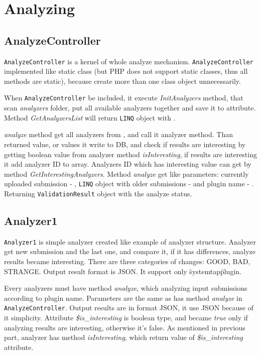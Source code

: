 \section{Analyzing}

\subsection{AnalyzeController}

\texttt{AnalyzeController} is a kernel of whole analyze mechanism. \texttt{AnalyzeController} implemented like static class (but PHP does not support static classes, thus all methods are static), because create more than one class object unnecessarily.

When \texttt{AnalyzeController} be included, it execute \emph{InitAnalyzers} method, that scan \emph{analyzers} folder, put all available analyzers together and save it to \emph{} attribute. Method \emph{GetAnalyzersList} will return \texttt{LINQ} object with \emph{}.

\emph{analyze} method get all analyzers from \emph{}, and call it analyzer method. Than returned value, or values it write to DB, and check if results are interesting by getting boolean value from analyzer method \emph{isInteresting}, if results are interesting it add analyzer ID to \emph{} array. Analyzers ID which has interesting value can get by method \emph{GetInterestingAnalyzers}. Method \emph{analyze} get like parameters: currently uploaded submission - \emph{}, \texttt{LINQ} object with older submissions - \emph{} and plugin name - \emph{}. Returning \texttt{ValidationResult} object with the analyze status.

\subsection{Analyzer1}

\texttt{Analyzer1} is simple analyzer created like example of analyzer structure. Analyzer get new submission and the last one, and compare it, if it has differences, analyze results became interesting. There are three categories of changes: GOOD, BAD, STRANGE. Output result format is JSON. It support only \"systemtap\" plugin.

Every analyzers must have method \emph{analyze}, which analyzing input submissions according to plugin name. Parameters are the same as has method \emph{analyze} in \texttt{AnalyzeController}. Output results are in format JSON, it use JSON because of it simplicity. Attribute \emph{\$is\_interesting} is boolean type, and became \emph{true} only if analyzing results are interesting, otherwise it's false. As mentioned in previous part, analyzer has method \emph{isInteresting}, which return value of \emph{\$is\_interesting} attribute.

